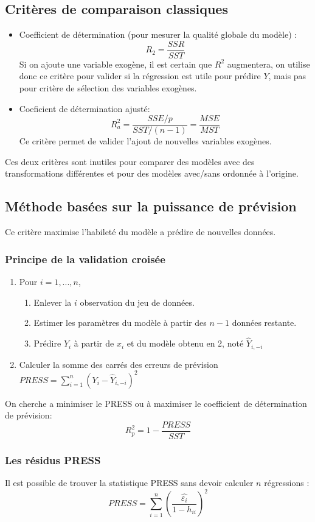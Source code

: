 \documentclass[10pt, french]{article}
\begin{document}
\begin{multicols*}{3}
\subsection*{Critères de comparaison classiques}
\begin{itemize}
	\item Coefficient de détermination (pour mesurer la qualité globale du modèle) :
	\[ R_2 = \frac{SSR}{SST} \]
	Si on ajoute une variable exogène, il est certain que $R^2$ augmentera, on utilise donc ce critère pour valider si la régression est utile pour prédire $Y$, mais pas pour critère de sélection des variables exogènes.
	\item Coeficient de détermination ajusté:
	\[ R_a^2 = \frac{SSE / p}{SST / (n-1)} = \frac{MSE}{MST} \]
	Ce critère permet de valider l'ajout de nouvelles variables exogènes.
\end{itemize}
Ces deux critères sont inutiles pour comparer des modèles avec des transformations différentes et pour des modèles avec/sans ordonnée à l'origine.

\subsection*{Méthode basées sur la puissance de prévision}
Ce critère maximise l'habileté du modèle a prédire de nouvelles données.
\subsubsection*{Principe de la validation croisée}
\begin{enumerate}
\item Pour $i = 1, ..., n$,
\begin{enumerate}[label=1.\arabic*]
	\item Enlever la $i$ observation du jeu de données.
	\item Estimer les paramètres du modèle à partir des $n - 1$ données restante.
	\item Prédire $Y_i$ à partir de $x_i$ et du modèle obtenu en 2, noté $\hat{Y}_{i,-i}$
\end{enumerate}
\item Calculer la somme des carrés des erreurs de prévision $PRESS = \sum_{i=1}^n (Y_i - \hat{Y}_{i,-i})^2$
\end{enumerate}
	On cherche a minimiser le PRESS ou à maximiser le coefficient de détermination de prévision:
	\[ R_p^2 = 1 - \frac{PRESS}{SST} \]
\subsubsection*{Les résidus PRESS}
	Il est possible de trouver la statistique PRESS sans devoir calculer $n$ régressions :
	\[ PRESS = \sum_{i=1}^n \left( \frac{\hat{\varepsilon_i}}{1 - h_{ii}} \right)^2 \]

\end{multicols*}
\end{document}
